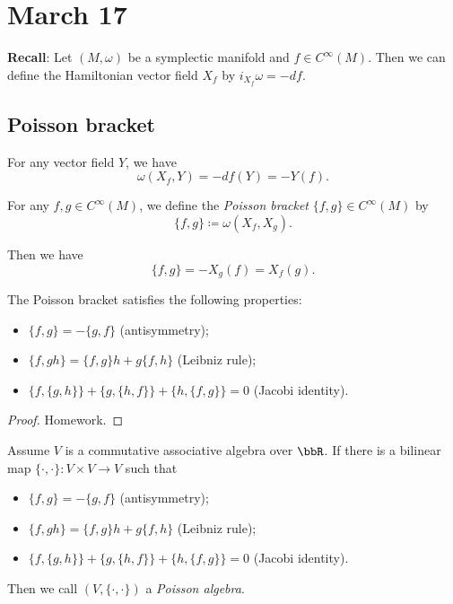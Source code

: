 \section{March 17}

\textbf{Recall}: Let $(M, \omega)$ be a symplectic manifold and $f \in C^\infty(M)$.
Then we can define the Hamiltonian vector field $X_f$ by $i_{X_f} \omega = -df$.

\subsection{Poisson bracket}

  For any vector field $Y$, we have
  \[ \omega(X_f, Y) = -df(Y) = -Y(f). \]

  \begin{definition}
    For any $f,g \in C^\infty(M)$, we define the \emph{Poisson bracket} $\{f, g\} \in C^\infty(M)$ by
    \[ \{f, g\} \coloneqq \omega(X_f, X_g). \]
  \end{definition}
  Then we have
  \[ \{f, g\} = -X_g(f) = X_f(g). \]
  \begin{proposition}
    The Poisson bracket satisfies the following properties:
    \begin{itemize}
      \item $\{f, g\} = -\{g, f\}$ (antisymmetry);
      \item $\{f, gh\} = \{f, g\}h + g\{f, h\}$ (Leibniz rule);
      \item $\{f, \{g, h\}\} + \{g, \{h, f\}\} + \{h, \{f, g\}\} = 0$ (Jacobi identity).
    \end{itemize}
  \end{proposition}
  \begin{proof}
    Homework.
  \end{proof}

  \begin{definition}
    Assume $V$ is a commutative associative algebra over $\bbR$.
    If there is a bilinear map $\{\cdot, \cdot\} : V \times V \to V$ such that
    \begin{itemize}
      \item $\{f, g\} = -\{g, f\}$ (antisymmetry);
      \item $\{f, gh\} = \{f, g\}h + g\{f, h\}$ (Leibniz rule);
      \item $\{f, \{g, h\}\} + \{g, \{h, f\}\} + \{h, \{f, g\}\} = 0$ (Jacobi identity).
    \end{itemize}
    Then we call $(V, \{\cdot, \cdot\})$ a \emph{Poisson algebra}.
  \end{definition}

